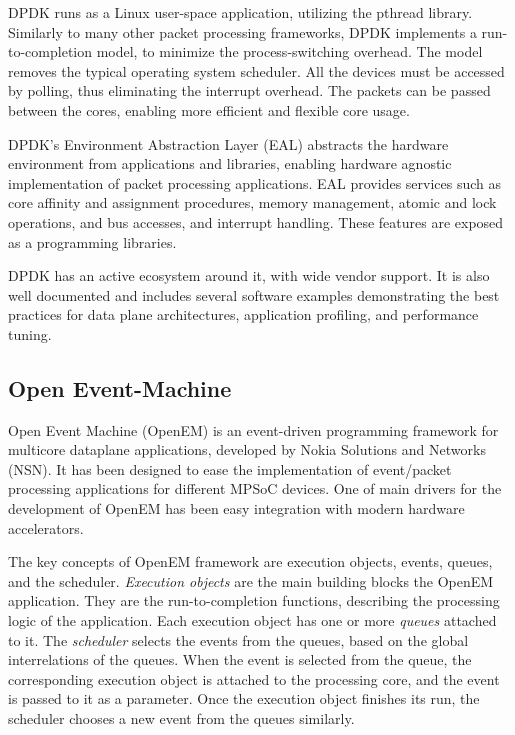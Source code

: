 DPDK runs as a Linux user-space application, utilizing the pthread library. Similarly to many other packet processing frameworks, DPDK implements a run-to-completion model, to minimize the process-switching overhead. The model removes the typical operating system scheduler. All the devices must be accessed by polling, thus eliminating the interrupt overhead. The packets can be passed between the cores, enabling more efficient and flexible core usage.~\cite{Intel:DPDK:Doc}

DPDK's Environment Abstraction Layer (EAL) abstracts the hardware environment from applications and libraries, enabling hardware agnostic implementation of packet processing applications. EAL provides services such as core affinity and assignment procedures, memory management, atomic and lock operations, and bus accesses, and interrupt handling. These features are exposed as a programming libraries.~\cite{Intel:DPDK:Doc}

DPDK has an active ecosystem around it, with wide vendor support. It is also well documented and includes several software examples demonstrating the best practices for data plane architectures, application profiling, and performance tuning.~\cite{Intel:DPDK:Doc}

\subsection{Open Event-Machine}
Open Event Machine (OpenEM) is an event-driven programming framework for multicore dataplane applications, developed by Nokia Solutions and Networks (NSN). It has been designed to ease the implementation of event/packet processing applications for different MPSoC devices. One of main drivers for the development of OpenEM has been easy integration with modern hardware accelerators.

The key concepts of OpenEM framework are execution objects, events, queues, and the scheduler. \emph{Execution objects} are the main building blocks the OpenEM application. They are the run-to-completion functions, describing the processing logic of the application. Each execution object has one or more \emph{queues} attached to it. The \emph{scheduler} selects the events from the queues, based on the global interrelations of the queues. When the event is selected from the queue, the corresponding execution object is attached to the processing core, and the event is passed to it as a parameter. Once the execution object finishes its run, the scheduler chooses a new event from the queues similarly.

